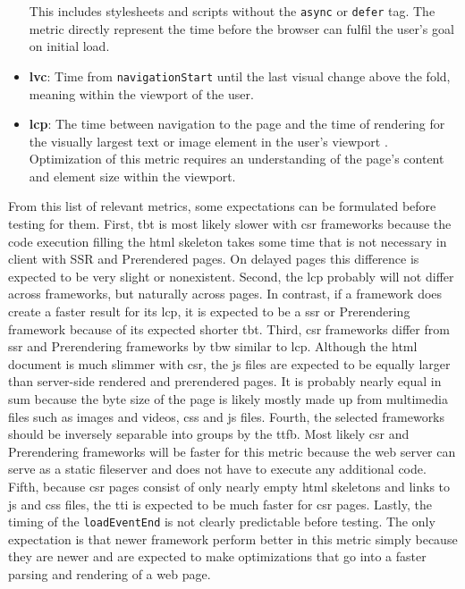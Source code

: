 \documentclass[a4paper, 12pt]{article}
\begin{document}
\begin{itemize}
  This includes stylesheets and scripts without the \verb|async| or \verb|defer| tag.
  The metric directly represent the time before the browser can fulfil the user's goal on initial load.
  \item \textbf{\acrfull{lvc}}: Time from \verb|navigationStart| until the last visual change above the fold, meaning within the viewport of the user. %
  \item \textbf{\acrfull{lcp}}: The time between navigation to the page and the time of rendering for the visually largest text or image element in the user's viewport \citep{lcpDocumentation}.
  Optimization of this metric requires an understanding of the page's content and element size within the viewport.
\end{itemize}

From this list of relevant metrics, some expectations can be formulated before testing for them.
First, \acrshort{tbt} is most likely slower with \acrshort{csr} frameworks because the code execution filling the \acrshort{html} skeleton takes some time that is not necessary in client with SSR and Prerendered pages.
On delayed pages this difference is expected to be very slight or nonexistent.
Second, the \acrshort{lcp} probably will not differ across frameworks, but naturally across pages.
In contrast, if a framework does create a faster result for its \acrshort{lcp}, it is expected to be a \acrshort{ssr} or Prerendering framework because of its expected shorter \acrshort{tbt}.
Third, \acrshort{csr} frameworks differ from \acrshort{ssr} and Prerendering frameworks by \acrlong{tbw} similar to \acrlong{lcp}.
Although the \acrshort{html} document is much slimmer with \acrshort{csr}, the \acrshort{js} files are expected to be equally larger than server-side rendered and prerendered pages.
It is probably nearly equal in sum because the byte size of the page is likely mostly made up from multimedia files such as images and videos, \acrshort{css} and \acrlong{js} files. 
Fourth, the selected frameworks should be inversely separable into groups by the \acrlong{ttfb}.
Most likely \acrshort{csr} and Prerendering frameworks will be faster for this metric because the web server can serve as a static fileserver and does not have to execute any additional code.
Fifth, because \acrshort{csr} pages consist of only nearly empty \acrshort{html} skeletons and links to \acrshort{js} and \acrshort{css} files, the \acrshort{tti} is expected to be much faster for \acrshort{csr} pages.
Lastly, the timing of the \verb|loadEventEnd| is not clearly predictable before testing.
The only expectation is that newer framework perform better in this metric simply because they are newer and are expected to make optimizations that go into a faster parsing and rendering of a web page.
\end{document}
